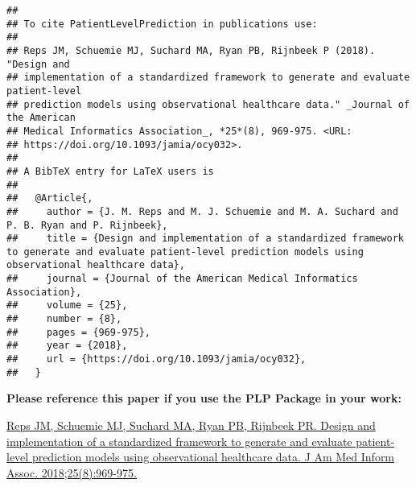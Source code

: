 \documentclass[
]{article}
\begin{document}
\begin{verbatim}
## 
## To cite PatientLevelPrediction in publications use:
## 
## Reps JM, Schuemie MJ, Suchard MA, Ryan PB, Rijnbeek P (2018). "Design and
## implementation of a standardized framework to generate and evaluate patient-level
## prediction models using observational healthcare data." _Journal of the American
## Medical Informatics Association_, *25*(8), 969-975. <URL:
## https://doi.org/10.1093/jamia/ocy032>.
## 
## A BibTeX entry for LaTeX users is
## 
##   @Article{,
##     author = {J. M. Reps and M. J. Schuemie and M. A. Suchard and P. B. Ryan and P. Rijnbeek},
##     title = {Design and implementation of a standardized framework to generate and evaluate patient-level prediction models using observational healthcare data},
##     journal = {Journal of the American Medical Informatics Association},
##     volume = {25},
##     number = {8},
##     pages = {969-975},
##     year = {2018},
##     url = {https://doi.org/10.1093/jamia/ocy032},
##   }
\end{verbatim}

\textbf{Please reference this paper if you use the PLP Package in your
work:}

\href{http://dx.doi.org/10.1093/jamia/ocy032}{Reps JM, Schuemie MJ,
Suchard MA, Ryan PB, Rijnbeek PR. Design and implementation of a
standardized framework to generate and evaluate patient-level prediction
models using observational healthcare data. J Am Med Inform Assoc.
2018;25(8):969-975.}
\end{document}
